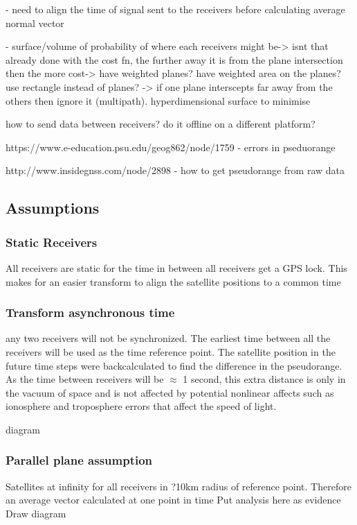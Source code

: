 \documentclass[11pt,a4paper]{article}
\begin{document}
- need to align the time of signal sent to the receivers before calculating average normal vector

- surface/volume of probability of where each receivers might be-> isnt that already done with the cost fn, the further away it is from the plane intersection then the more cost-> have weighted planes? have weighted area on the planes? use rectangle instead of planes? -> if one plane interscepts far away from the others then ignore it (multipath). hyperdimensional surface to minimise




how to send data between receivers? do it offline on a different platform?


https://www.e-education.psu.edu/geog862/node/1759 - errors in pseduorange

http://www.insidegnss.com/node/2898 - how to get pseudorange from raw data

\subsection{Assumptions}
\subsubsection{Static Receivers}
All receivers are static for the time in between all receivers get a GPS lock. This makes for an easier transform to align the satellite positions to a common time 

\subsubsection{Transform asynchronous time }
any two receivers will not be synchronized. The earliest time between all the receivers will be used as the time reference point. The satellite position in the future time steps were backcalculated to find the difference in the pseudorange. As the time between receivers will be $\approx$ 1 second, this extra distance is only in the vacuum of space and is not affected by potential nonlinear affects such as ionosphere and troposphere errors that affect the speed of light.

diagram

\subsubsection{Parallel plane assumption}
Satellites at infinity for all receivers in ?10km radius of reference point. Therefore an average vector calculated at one point in time  
Put analysis here as evidence
Draw diagram
\end{document}
